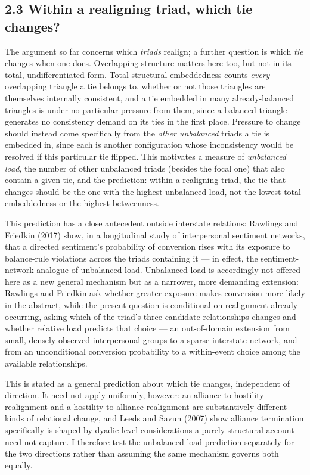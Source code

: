 \documentclass[Afour,sageh,times,doublespace]{sagej}
\begin{document}
\subsection*{2.3 Within a realigning triad, which tie changes?}

The argument so far concerns which \emph{triads} realign; a further question is which \emph{tie} changes when one does. Overlapping structure matters here too, but not in its total, undifferentiated form. Total structural embeddedness counts \emph{every} overlapping triangle a tie belongs to, whether or not those triangles are themselves internally consistent, and a tie embedded in many already-balanced triangles is under no particular pressure from them, since a balanced triangle generates no consistency demand on its ties in the first place. Pressure to change should instead come specifically from the \emph{other unbalanced} triads a tie is embedded in, since each is another configuration whose inconsistency would be resolved if this particular tie flipped. This motivates a measure of \emph{unbalanced load}, the number of other unbalanced triads (besides the focal one) that also contain a given tie, and the prediction: within a realigning triad, the tie that changes should be the one with the highest unbalanced load, not the lowest total embeddedness or the highest betweenness.

This prediction has a close antecedent outside interstate relations: Rawlings and Friedkin (2017) show, in a longitudinal study of interpersonal sentiment networks, that a directed sentiment's probability of conversion rises with its exposure to balance-rule violations across the triads containing it --- in effect, the sentiment-network analogue of unbalanced load. Unbalanced load is accordingly not offered here as a new general mechanism but as a narrower, more demanding extension: Rawlings and Friedkin ask whether greater exposure makes conversion more likely in the abstract, while the present question is conditional on realignment already occurring, asking which of the triad's three candidate relationships changes and whether relative load predicts that choice --- an out-of-domain extension from small, densely observed interpersonal groups to a sparse interstate network, and from an unconditional conversion probability to a within-event choice among the available relationships.

This is stated as a general prediction about which tie changes, independent of direction. It need not apply uniformly, however: an alliance-to-hostility realignment and a hostility-to-alliance realignment are substantively different kinds of relational change, and Leeds and Savun (2007) show alliance termination specifically is shaped by dyadic-level considerations a purely structural account need not capture. I therefore test the unbalanced-load prediction separately for the two directions rather than assuming the same mechanism governs both equally.
\end{document}
